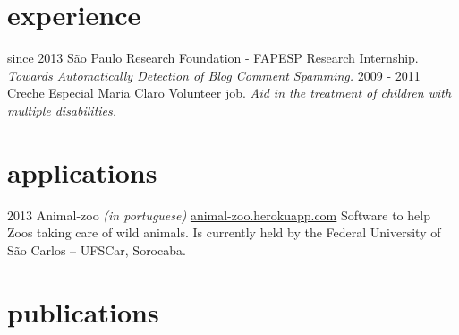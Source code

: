 \documentclass[]{friggeri-cv}
\begin{document}
\section{experience}

\begin{entrylist}
  \entry
    {since 2013}
    {São Paulo Research Foundation - FAPESP}
    {Research Internship.}
    {\emph{Towards Automatically Detection of Blog Comment Spamming.}}
  \entry
    {2009 - 2011}
    {Creche Especial Maria Claro}
    {Volunteer job.}
    {\emph{Aid in the treatment of children with multiple disabilities.}}
\end{entrylist}

\section{applications}

\begin{entrylist}
  \entry
    {2013}
    {Animal-zoo \emph{(in portuguese)}}
    {\href{http://animal-zoo.herokuapp.com}{animal-zoo.herokuapp.com}}
    {Software to help Zoos taking care of wild animals. Is currently held by the Federal University of São Carlos -- UFSCar, Sorocaba.}
\end{entrylist}

\section{publications}


\begin{refsection}
  \nocite{*}
  \printbibliography[sorting=chronological, type=inproceedings, title={international conferences/proceedings}, notkeyword={brazil}, heading=subbibliography]
\end{refsection}
\begin{refsection}
  \nocite{*}
  \printbibliography[sorting=chronological, type=inproceedings, title={local conferences/proceedings}, keyword={brazil}, heading=subbibliography]
\end{refsection}
\end{document}
